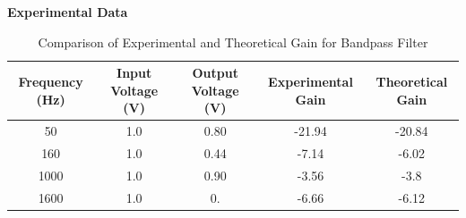\documentclass{article}
\begin{document}
\textbf{Experimental Data}
\begin{table}[H]
    \centering
    \begin{tabular}{|c|c|c|c|c|}
        \hline
        Frequency (Hz) & Input Voltage (V) & Output Voltage (V) & Experimental Gain & Theoretical Gain\\
        \hline
        50 & 1.0 & 0.80 & -21.94 & -20.84 \\
        160 & 1.0 & 0.44 & -7.14 & -6.02 \\
        1000 & 1.0 & 0.90 & -3.56 & -3.8 \\
        1600 & 1.0 & 0. & -6.66 & -6.12 \\
        \hline
    \end{tabular}
    \caption{Comparison of Experimental and Theoretical Gain for Bandpass Filter}
    \label{tab:exp_data_bpf}
\end{table}
\begin{figure}[H]
    \centering
    \hfill
\end{figure}
\begin{figure}[H]
    \centering
    \hfill
\end{figure}
\end{document}
